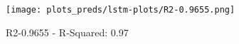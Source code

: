 
\begin{figure}[H]
    \centering
    \texttt{[image: plots\_preds/lstm-plots/R2-0.9655.png]}
    \caption{R2-0.9655 - R-Squared: 0.97}
\end{figure}
